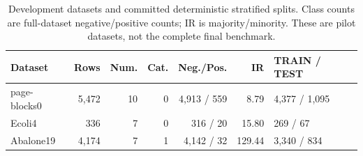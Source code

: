 \begin{table}[t]
  \centering
  \caption{Development datasets and committed deterministic stratified splits.
  Class counts are full-dataset negative/positive counts; IR is
  majority/minority. These are pilot datasets, not the complete final
  benchmark.}
  \label{tab:development-datasets}
  \small
  \begin{tabularx}{\linewidth}{@{}lrrrrrX@{}}
    \toprule
    Dataset & Rows & Num. & Cat. & Neg./Pos. & IR & TRAIN / TEST \\
    \midrule
    page-blocks0 & 5,472 & 10 & 0 & 4,913 / 559 & 8.79 & 4,377 / 1,095 \\
    Ecoli4       &   336 &  7 & 0 &   316 / 20  & 15.80 & 269 / 67 \\
    Abalone19    & 4,174 &  7 & 1 & 4,142 / 32  & 129.44 & 3,340 / 834 \\
    \bottomrule
  \end{tabularx}
\end{table}
